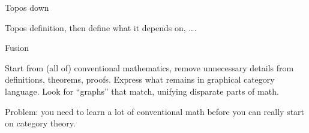 \begin{plSection}{Topos down}
\label{sec:Topos-down}
 
Topos definition, then define what it depends on, \ldots.
 
\end{plSection}%
\begin{plSection}{Fusion}
\label{sec:Fusion}

Start from (all of) conventional mathematics,
remove unnecessary details from definitions, theorems, proofs.
Express what remains in graphical category language.
Look for ``graphs'' that match, unifying disparate parts of math.

Problem: you need to learn a lot of conventional math before
you can really start on category theory.

\end{plSection}%
